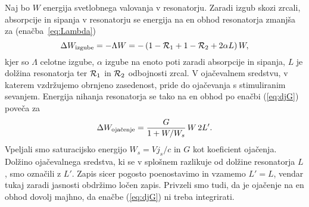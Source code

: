 Naj bo $W$ energija svetlobnega valovanja v resonatorju. Zaradi izgub skozi
zrcali, absorpcije in sipanja v resonatorju se energija na en obhod 
resonatorja zmanjša za (enačba~\ref{eq:Lambda})
\begin{equation}
\Delta W_{\rm izgube}=-\Lambda W=-\left(1-{\cal {R}}_{1}+1-{\cal {R}}_{2}
+2\alpha L\right)W,
\label{5.1}
\end{equation}
kjer so $\Lambda $ celotne izgube, $\alpha$ izgube na enoto poti zaradi
absorpcije in sipanja, $L$ je dolžina resonatorja ter 
${\cal {R}}_{1}$ in ${\cal {R}}_{2}$ odbojnosti
zrcal. V ojačevalnem sredstvu, v katerem vzdržujemo obrnjeno zasedenost,
pride do ojačevanja s stimuliranim sevanjem. Energija nihanja resonatorja 
se tako na en obhod po enačbi (\ref{eq:djG}) poveča za 
\begin{equation}  
\Delta W_{\rm oja\check{c}enje}=\frac{G}{1+W/W_s}\,W\, 2L'.
\label{5.2}
\end{equation}
Vpeljali smo saturacijsko energijo $W_s=Vj_s/c$ in $G$ kot koeficient ojačenja.
Dolžino ojačevalnega sredstva,
ki se v splošnem razlikuje od dolžine resonatorja $L$, smo označili z $L'$.
Zapis sicer pogosto poenostavimo in vzamemo $L'=L$, vendar tukaj zaradi
jasnosti obdržimo ločen zapis. Privzeli smo tudi, da je ojačenje na en
obhod dovolj majhno, da enačbe (\ref{eq:djG}) ni treba integrirati.

